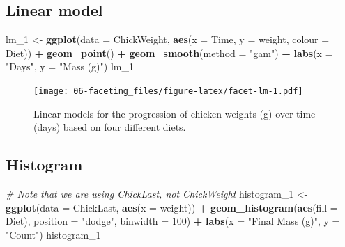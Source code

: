 \documentclass[
]{book}
\newenvironment{Shaded}{\begin{snugshade}}{\end{snugshade}}
\newcommand{\CommentTok}[1]{\textcolor[rgb]{0.56,0.35,0.01}{\textit{#1}}}
\newcommand{\DataTypeTok}[1]{\textcolor[rgb]{0.13,0.29,0.53}{#1}}
\newcommand{\DecValTok}[1]{\textcolor[rgb]{0.00,0.00,0.81}{#1}}
\newcommand{\KeywordTok}[1]{\textcolor[rgb]{0.13,0.29,0.53}{\textbf{#1}}}
\newcommand{\NormalTok}[1]{#1}
\newcommand{\OperatorTok}[1]{\textcolor[rgb]{0.81,0.36,0.00}{\textbf{#1}}}
\newcommand{\StringTok}[1]{\textcolor[rgb]{0.31,0.60,0.02}{#1}}
\begin{document}
\hypertarget{linear-model}{%
\subsection{Linear model}\label{linear-model}}

\begin{Shaded}
\begin{Highlighting}[]
\NormalTok{lm\_}\DecValTok{1}\NormalTok{ <{-}}\StringTok{ }\KeywordTok{ggplot}\NormalTok{(}\DataTypeTok{data =}\NormalTok{ ChickWeight, }\KeywordTok{aes}\NormalTok{(}\DataTypeTok{x =}\NormalTok{ Time, }\DataTypeTok{y =}\NormalTok{ weight, }\DataTypeTok{colour =}\NormalTok{ Diet)) }\OperatorTok{+}
\StringTok{  }\KeywordTok{geom\_point}\NormalTok{() }\OperatorTok{+}
\StringTok{  }\KeywordTok{geom\_smooth}\NormalTok{(}\DataTypeTok{method =} \StringTok{"gam"}\NormalTok{) }\OperatorTok{+}
\StringTok{  }\KeywordTok{labs}\NormalTok{(}\DataTypeTok{x =} \StringTok{"Days"}\NormalTok{, }\DataTypeTok{y =} \StringTok{"Mass (g)"}\NormalTok{)}
\NormalTok{lm\_}\DecValTok{1}
\end{Highlighting}
\end{Shaded}

\begin{figure}
\centering
\texttt{[image: 06-faceting\_files/figure-latex/facet-lm-1.pdf]}
\caption{\label{fig:facet-lm}Linear models for the progression of chicken weights (g) over time (days) based on four different diets.}
\end{figure}

\hypertarget{histogram}{%
\subsection{Histogram}\label{histogram}}

\begin{Shaded}
\begin{Highlighting}[]
\CommentTok{\# Note that we are using \textquotesingle{}ChickLast\textquotesingle{}, not \textquotesingle{}ChickWeight\textquotesingle{}}
\NormalTok{histogram\_}\DecValTok{1}\NormalTok{ <{-}}\StringTok{ }\KeywordTok{ggplot}\NormalTok{(}\DataTypeTok{data =}\NormalTok{ ChickLast, }\KeywordTok{aes}\NormalTok{(}\DataTypeTok{x =}\NormalTok{ weight)) }\OperatorTok{+}
\StringTok{  }\KeywordTok{geom\_histogram}\NormalTok{(}\KeywordTok{aes}\NormalTok{(}\DataTypeTok{fill =}\NormalTok{ Diet), }\DataTypeTok{position =} \StringTok{"dodge"}\NormalTok{, }\DataTypeTok{binwidth =} \DecValTok{100}\NormalTok{) }\OperatorTok{+}
\StringTok{  }\KeywordTok{labs}\NormalTok{(}\DataTypeTok{x =} \StringTok{"Final Mass (g)"}\NormalTok{, }\DataTypeTok{y =} \StringTok{"Count"}\NormalTok{)}
\NormalTok{histogram\_}\DecValTok{1}
\end{Highlighting}
\end{Shaded}
\end{document}
